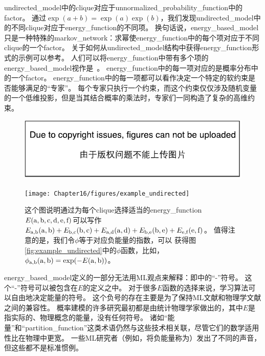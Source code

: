 \gls{undirected_model}中的\gls{clique}对应于\gls{unnormalized_probability_function}中的\gls{factor}。 
通过$\exp(a+b) = \exp(a) \exp(b)$，我们发现\gls{undirected_model}中的不同\gls{clique}对应于\gls{energy_function}的不同项。
换句话说，\gls{energy_based_model}只是一种特殊的\gls{markov_network}：求幂使\gls{energy_function}中的每个项对应于不同\gls{clique}的一个\gls{factor}。
关于如何从\gls{undirected_model}结构中获得\gls{energy_function}形式的示例可以参考。
人们可以将\gls{energy_function}中带有多个项的\gls{energy_based_model}视作是~\citep{Hinton99}。
\gls{energy_function}中的每一项对应的是概率分布中的一个\gls{factor}。
\gls{energy_function}中的每一项都可以看作决定一个特定的软约束是否能够满足的``专家''。
每个专家只执行一个约束，而这个约束仅仅涉及随机变量的一个低维投影，但是当其结合概率的乘法时，专家们一同构造了复杂的高维约束。



\begin{figure}[!htb]
\ifOpenSource
\centerline{\includegraphics{figure.pdf}}
\else
	\centerline{\texttt{[image: Chapter16/figures/example\_undirected]}}
\fi
\caption{这个图说明通过为每个\gls{clique}选择适当的\gls{energy_function} $E(\mathrm{a},\mathrm{b},\mathrm{c},\mathrm{d},\mathrm{e},\mathrm{f})$可以写作$E_{\mathrm{a},\mathrm{b}}(\mathrm{a},\mathrm{b}) + E_{\mathrm{b},\mathrm{c}}(\mathrm{b},\mathrm{c}) + E_{\mathrm{a},\mathrm{d}}(\mathrm{a},\mathrm{d})+  E_{\mathrm{b},\mathrm{e}}(\mathrm{b},\mathrm{e}) + E_{\mathrm{e},\mathrm{f}}(\mathrm{e},\mathrm{f})$。
值得注意的是，我们令$\phi$等于对应负能量的指数，可以
获得图\ref{fig:example_undirected}中的$\phi$函数，比如，$\phi_{\mathrm{a},\mathrm{b}}(\mathrm{a},\mathrm{b}) = \exp(-E(\mathrm{a},\mathrm{b}))$。}
	\label{fig:example_undirected_2}
\end{figure}


\gls{energy_based_model}定义的一部分无法用\gls{ML}观点来解释：即中的``-''符号。
这个``-''符号可以被包含在$E$的定义之中。
对于很多$E$函数的选择来说，学习算法可以自由地决定能量的符号。
这个负号的存在主要是为了保持\gls{ML}文献和物理学文献之间的兼容性。
概率建模的许多研究最初都是由统计物理学家做出的，其中$E$是指实际的、物理概念的能量，没有任何符号。
诸如``能量''和``\gls{partition_function}''这类术语仍然与这些技术相关联，尽管它们的数学适用性比在物理中更宽。
一些\gls{ML}研究者（例如，\citet{Smolensky86}将负能量称为）发出了不同的声音，但这些都不是标准惯例。


